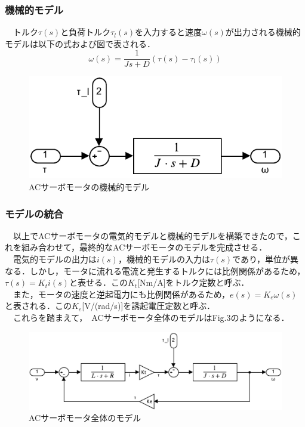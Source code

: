 \subsubsection{機械的モデル}
　トルク$\tau(s)$と負荷トルク$\tau_l(s)$を入力すると速度$\omega(s)$が出力される機械的モデルは以下の式および図で表される．
\begin{equation}
    \omega(s) = \frac{1}{Js + D}\left(\tau(s) - \tau_l(s)\right)
\end{equation}

\begin{figure}[H]
    \centering
    \includegraphics[]{./fig/fig2.pdf}
    \caption{ACサーボモータの機械的モデル}
\end{figure}

\subsubsection{モデルの統合}
　以上でACサーボモータの電気的モデルと機械的モデルを構築できたので，これを組み合わせて，最終的なACサーボモータのモデルを完成させる．\\
　電気的モデルの出力は$i(s)$，機械的モデルの入力は$\tau(s)$であり，単位が異なる．しかし，モータに流れる電流と発生するトルクには比例関係があるため，$\tau(s) = K_t i(s)$と表せる．この$K_t$[Nm/A]をトルク定数と呼ぶ．\\
　また，モータの速度と逆起電力にも比例関係があるため，$e(s) = K_e \omega(s)$と表される．この$K_e$[V/(rad/s)]を誘起電圧定数と呼ぶ．\\
　これらを踏まえて，　ACサーボモータ全体のモデルはFig.3のようになる．
\begin{figure}[H]
    \centering
    \includegraphics[width=15cm]{./fig/fig3.pdf}
    \caption{ACサーボモータ全体のモデル}
\end{figure}

